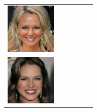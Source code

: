 \documentclass{article}
\newcommand{\pganw}{0.95in}
\begin{document}
\begin{table}[htbp]
\begin{center}
\begin{tabular}{cc|cc|cc}
\includegraphics[width=\pganw]{figures/pgan/53_base_iso_MH.jpg} \\
\includegraphics[width=\pganw]{figures/pgan/54_base_iso_base.jpg} &

\end{tabular}
\end{center}
\end{table}
\end{document}
